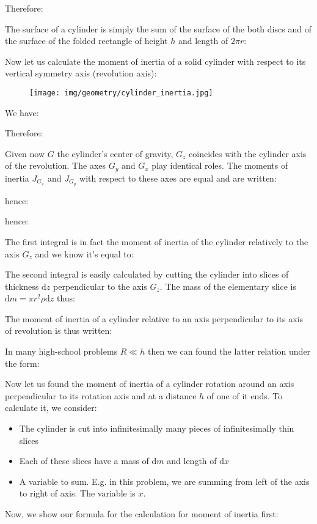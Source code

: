 {	Therefore:
	
	The surface of a cylinder is simply the sum of the surface of the both discs and of the surface of the folded rectangle of height $h$ and length of $2\pi r$:
	
	Now let us calculate the moment of inertia of a solid cylinder with respect to its vertical symmetry axis (revolution axis):
	\begin{figure}[H]
		\centering
		\texttt{[image: img/geometry/cylinder\_inertia.jpg]}
	\end{figure}
	We have:
	
	Therefore:
	
	Given now $G$ the cylinder's center of gravity, $G_z$ coincides with the cylinder axis of the revolution. The axes $G_y$ and $G_x$ play identical roles. The moments of inertia $J_{G_x}$ and $J_{G_y}$ with respect to these axes are equal and are written:
	
	hence:
	
	hence:
	
	The first integral is in fact the moment of inertia of the cylinder relatively to the axis $G_z$ and we know it's equal to:
	
	The second integral is easily calculated by cutting the cylinder into slices  of thickness $\mathrm{d}z$ perpendicular to the axis $G_z$. The mass of the elementary slice is $\mathrm{d}m=\pi r^2\rho\mathrm{d}z$ thus:
	
	The moment of inertia of a cylinder relative to an axis perpendicular to its axis of revolution is thus written:
	
	In many high-school problems $R\ll h$ then we can found the latter relation under the form:
	
	Now let us found the moment of inertia of a cylinder rotation around an axis perpendicular to its rotation axis and at a distance $h$ of one of it ends. To calculate it, we consider:
	\begin{itemize}
		\item The cylinder is cut into infinitesimally many pieces of infinitesimally thin slices

		\item Each of these slices have a mass of $\mathrm{d}m$ and length of $\mathrm{d}x$

		\item A variable to sum. E.g. in this problem, we are summing from left of the axis to right of axis. The variable is $x$.
	\end{itemize}
	Now, we show our formula for the calculation for moment of inertia first:
	
}
